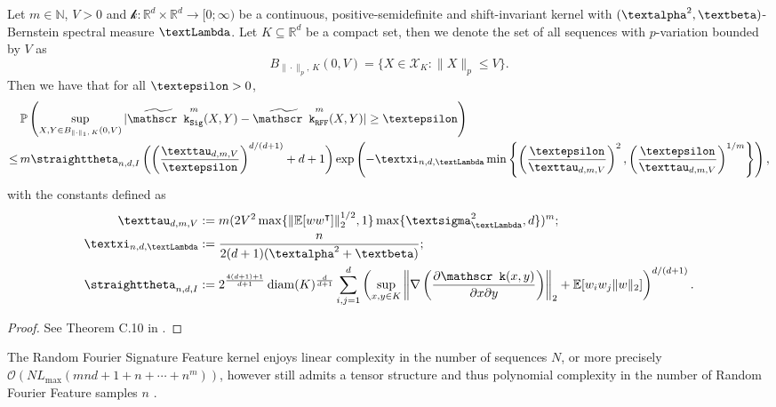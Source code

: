 \documentclass[openany]{book}
\begin{document}
\begin{theorem}\label{unif-conv-rfsf}
    Let $m\in \mathbb N$, $V>0$ and $\mathscr k:\mathbb R^d\times \mathbb R^d\to [0;\infty)$ be a continuous, positive-semidefinite and shift-invariant kernel with $(\galpha^2, \gbeta)$-Bernstein spectral measure $\gLambda$. Let $K\subseteq \mathbb R^d$ be a compact set, then we denote the set of all sequences with $p$-variation bounded by $V$ as 
    \begin{equation*}
        B_{\|\cdot \|_p,\,K}(0,V)=\{X\in \mathscr X_K:\|X\|_p\leq V\}.
    \end{equation*}
    Then we have that for all $\gepsilon>0$,
    \begin{equation*}
    \begin{split}
        &\,\mathbb P\left(\sup_{X,Y\in B_{\|\cdot \|_1,\,K}(0,V)} \vert \widetilde{\mathscr k}^m_{\mathtt{Sig}}(X,Y)-\widetilde{\mathscr k}_{\mathtt{RFF}}^{m}(X,Y)\vert \geq \gepsilon\right)\\\leq&\,m\gtheta_{n, d,I}\left(\biggl(\frac{\gtau_{d,m,V}}{\gepsilon}\right)^{d/(d+1)}+d+1\biggr)\exp\left(-\gxi_{n, d,\gLambda}\min\left\{\left(\frac{\gepsilon}{\gtau_{d,m,V}}\right)^2, \left(\frac{\gepsilon}{\gtau_{d,m,V}}\right)^{1/m}\right\}\right),
    \end{split}
    \end{equation*}
    with the constants defined as
    \begin{equation*}
        \begin{split}
            \gtau_{d,m,V}&:=m(2V^2\max\{\|\mathbb E[ww^\intercal]\|_2^{1/2}, 1\}\max\{\gsigma^2_{\gLambda},d\})^m;
            \\ \gxi_{n, d,\gLambda}&:=\frac{n}{2(d+1)(\galpha^2+\gbeta)};\\
            \gtheta_{n, d,I}&:=2^{\frac{4(d+1)+1}{d+1}}\diam(K)^{\frac{d}{d+1}}\sum_{i,j=1}^d\left(\sup_{x,y\in K}\left\|\nabla \left(\frac{\partial \mathscr k(x,y)}{\partial x\partial y}\right)\right\|_2+\mathbb E[w_iw_j\|w\|_2]\right)^{d/(d+1)}.
        \end{split}
    \end{equation*}
    \begin{proof}
        See Theorem C.10 in \cite{toth2025}.
    \end{proof}
\end{theorem}
The Random Fourier Signature Feature kernel enjoys linear complexity in the number of sequences $N$, or more precisely $\mathscr O(NL_{\max}(mnd+1+n+\cdots +n^m))$, however still admits a tensor structure and thus polynomial complexity in the number of Random Fourier Feature samples $n$ \cite{toth2025}.
\end{document}
